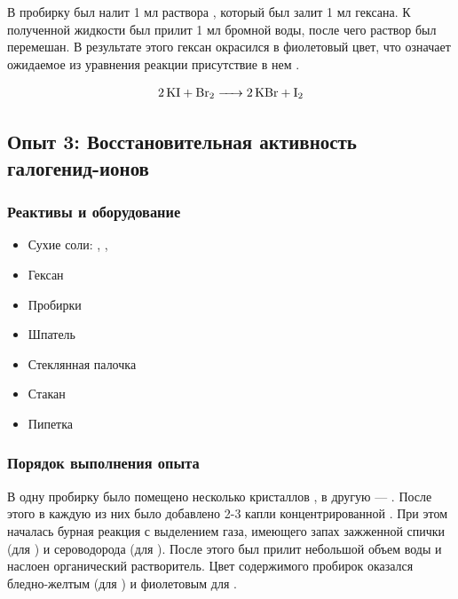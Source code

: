 \documentclass[a4paper, 12pt]{article}
\begin{document}
В пробирку был налит 1 мл раствора , который был залит 1 мл гексана. К полученной жидкости был прилит 1 мл бромной воды, после чего раствор был перемешан. В результате этого гексан окрасился в фиолетовый цвет, что означает ожидаемое из уравнения реакции присутствие в нем .

\begin{align}
	\ce{2KI + Br2 -> 2KBr + I2}
\end{align}


\subsection{Опыт 3: Восстановительная активность галогенид-ионов}

\subsubsection{Реактивы и оборудование}

\begin{itemize}
	\item Сухие соли: , , 
	
	\item Гексан
	
	\item Пробирки
	
	\item Шпатель
	
	\item Стеклянная палочка
	
	\item Стакан
	
	\item Пипетка
\end{itemize}

\subsubsection{Порядок выполнения опыта}

В одну пробирку было помещено несколько кристаллов , в другую --- . После этого в каждую из них было добавлено 2-3 капли концентрированной . При этом началась бурная реакция с выделением газа, имеющего запах зажженной спички (для ) и сероводорода (для ). После этого был прилит небольшой объем воды и наслоен органический растворитель. Цвет содержимого пробирок оказался бледно-желтым (для ) и фиолетовым для .
\end{document}
